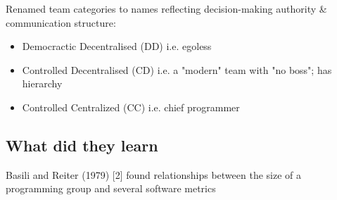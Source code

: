 Renamed team categories to names reflecting decision-making authority \& communication structure:

\begin{itemize}
    \item Democractic Decentralised (DD) i.e. egoless
    \item Controlled Decentralised (CD) i.e. a "modern" team with "no boss"; has hierarchy
    \item Controlled Centralized (CC) i.e. chief programmer
\end{itemize}

\subsection{What did they learn}

Basili and Reiter (1979) [2] \cite{basili1979investigation} found relationships between the size of a programming group and several software metrics
